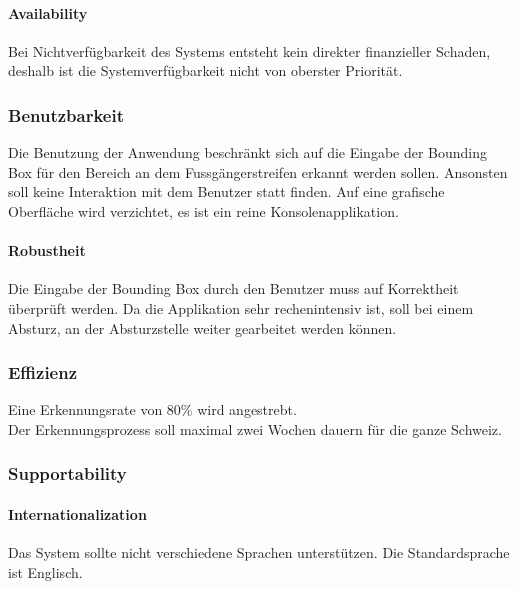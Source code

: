 \paragraph{Availability}
Bei Nichtverfügbarkeit des Systems entsteht kein direkter finanzieller Schaden, deshalb ist die Systemverfügbarkeit nicht von oberster Priorität. 
\subsubsection{Benutzbarkeit}
Die Benutzung der Anwendung beschränkt sich auf die Eingabe der Bounding Box für den Bereich an dem Fussgängerstreifen erkannt werden sollen. Ansonsten soll keine Interaktion mit dem Benutzer statt finden. Auf eine grafische Oberfläche wird verzichtet, es ist ein reine Konsolenapplikation.

\paragraph{Robustheit}
Die Eingabe der Bounding Box durch den Benutzer muss auf Korrektheit überprüft werden. Da die Applikation sehr rechenintensiv ist, soll bei einem Absturz, an der Absturzstelle weiter gearbeitet werden können.
\subsubsection{Effizienz}
Eine Erkennungsrate von 80\% wird angestrebt.\\
Der Erkennungsprozess soll maximal zwei Wochen dauern für die ganze Schweiz.

\subsubsection{Supportability}
\paragraph{Internationalization}
Das System sollte nicht verschiedene Sprachen unterstützen. 
Die Standardsprache ist Englisch.


